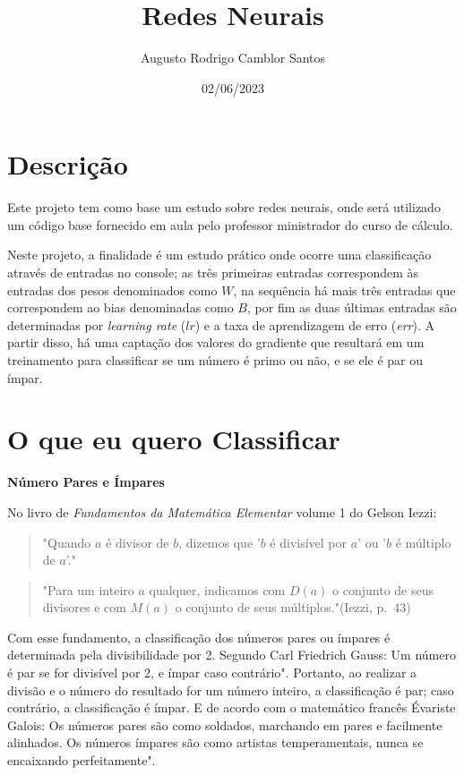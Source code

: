 \documentclass{article}
\title{Redes Neurais}
\author{Augusto Rodrigo Camblor Santos}
\date{02/06/2023}
\begin{document}
\maketitle

\section{Descrição}

Este projeto tem como base um estudo sobre redes neurais, onde será utilizado um código base fornecido em aula pelo professor ministrador do curso de cálculo.

Neste projeto, a finalidade é um estudo prático onde ocorre uma classificação através de entradas no console; as três primeiras entradas correspondem às entradas dos pesos denominados como $W$, na sequência há mais três entradas que correspondem ao bias denominadas como $B$, por fim as duas últimas entradas são determinadas por \textit{learning rate} ($lr$) e a taxa de aprendizagem de erro (\textit{err}). A partir disso, há uma captação dos valores do gradiente que resultará em um treinamento para classificar se um número é primo ou não, e se ele é par ou ímpar.

\section{O que eu quero Classificar}

\textbf{Número Pares e Ímpares}

No livro de \textit{Fundamentos da Matemática Elementar} volume 1 do Gelson Iezzi:

\begin{quote}
\setlength{\parindent}{4cm}
\setlength{\baselineskip}{1.5\baselineskip}
\fontsize{10}{10}\selectfont
"Quando $a$ é divisor de $b$, dizemos que '$b$ é divisível por $a$' ou '$b$ é múltiplo de $a$'."
\end{quote}
\begin{quote}
\setlength{\parindent}{4cm}
\setlength{\baselineskip}{1.5\baselineskip}
\fontsize{10}{10}\selectfont
"Para um inteiro $a$ qualquer, indicamos com $D(a)$ o conjunto de seus divisores e com $M(a)$ o conjunto de seus múltiplos."(Iezzi, p.~43)\cite{iezzifundamentos}
\end{quote}

Com esse fundamento, a classificação dos números pares ou ímpares é determinada pela divisibilidade por 2. Segundo Carl Friedrich Gauss: Um número é par se for divisível por 2, e ímpar caso contrário". Portanto, ao realizar a divisão e o número do resultado for um número inteiro, a classificação é par; caso contrário, a classificação é ímpar. E de acordo com o matemático francês Évariste Galois: Os números pares são como soldados, marchando em pares e facilmente alinhados. Os números ímpares são como artistas temperamentais, nunca se encaixando perfeitamente".
\end{document}
